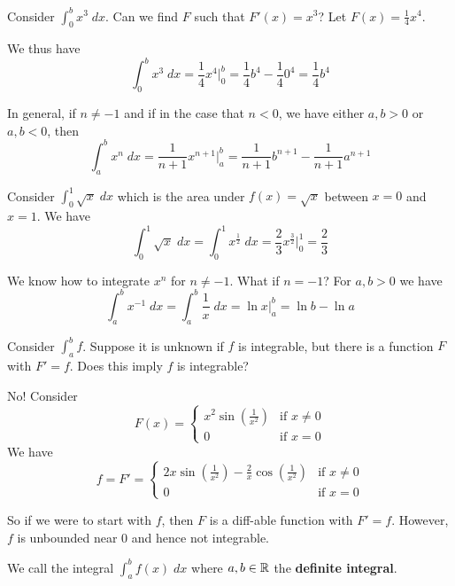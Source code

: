 \documentclass{article}
\begin{document}
  \begin{example}
    Consider $\int_0^b x^3 \; dx$. Can we find $F$ such that $F'(x) = x^3$? Let $F(x) = \frac{1}{4}x^4$.

    We thus have \[
      \int_0^b x^3 \; dx = \frac{1}{4}x^4\Big|_0^b = \frac{1}{4}b^4 - \frac{1}{4}0^4 = \frac{1}{4}b^4
    \]
  \end{example}
  \begin{proposition}
    In general, if $n \neq -1$ and if in the case that $n < 0$, we have either $a, b > 0$ or $a, b < 0$, then \[
      \int_a^b x^n \; dx = \frac{1}{n+1}x^{n+1}\Big|_a^b = \frac{1}{n+1}b^{n+1} - \frac{1}{n+1}a^{n+1}
    \]
  \end{proposition}
  \begin{example}
    Consider $\int_0^1 \sqrt{x}\; dx$ which is the area under $f(x) = \sqrt{x}$ between $x=0$ and $x=1$. We have \[
      \int_0^1 \sqrt{x} \; dx = \int_0^1 x^{\frac{1}{2}} \; dx = \frac{2}{3}x^\frac{3}{2}\Big|_0^1 = \frac{2}{3}
    \]
  \end{example}
  \begin{remark}
    We know how to integrate $x^n$ for $n \neq -1$. What if $n = -1$? For $a, b > 0$ we have \[
      \int_a^b x^{-1} \; dx = \int_a^b \frac{1}{x} \; dx = \ln x\Big|_a^b = \ln b - \ln a
    \]
  \end{remark}
  \begin{remark}
    Consider $\int_a^b f$. Suppose it is unknown if $f$ is integrable, but there is a function $F$ with $F' = f$. Does this imply $f$ is integrable?

    No! Consider \[
      F(x) =
      \begin{cases}
        x^2\sin(\frac{1}{x^2}) & \text{if } x \neq 0\\
        0 & \text{if } x = 0
      \end{cases}
    \]
    We have \[
      f = F' =
      \begin{cases}
        2x\sin\left(\frac{1}{x^2}\right) - \frac{2}{x}\cos\left(\frac{1}{x^2}\right) & \text{if } x \neq 0\\
        0 & \text{if } x = 0
      \end{cases}
    \]

    So if we were to start with $f$, then $F$ is a diff-able function with $F' = f$. However, $f$ is unbounded near 0
    and hence not integrable.
  \end{remark}
  \begin{definition}
    We call the integral $\int_a^b f(x) \; dx$ where $a, b \in \mathbb{R}$ the \textbf{definite integral}.
  \end{definition}
\end{document}
